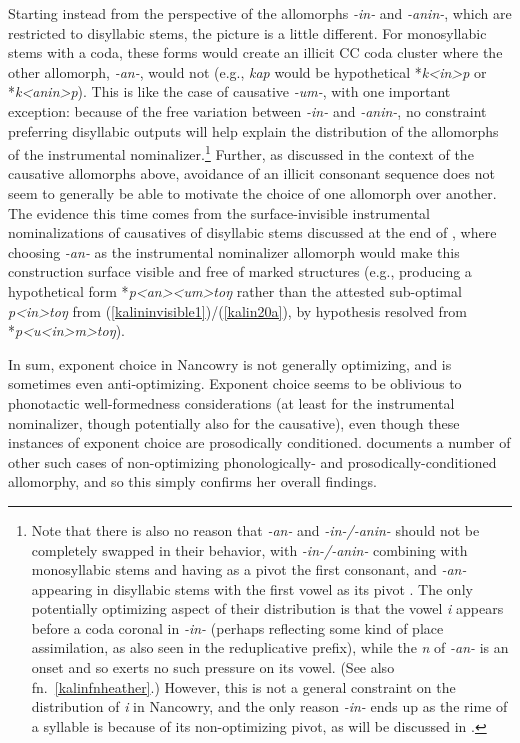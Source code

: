 \documentclass[output=paper]{langscibook}
\begin{document}
Starting instead from the perspective of the allomorphs \textit{-in-} and \textit{-anin-}, which are restricted to disyllabic stems, the picture is a little different. For monosyllabic stems with a coda, these forms would create an illicit CC coda cluster where the other allomorph, \textit{-an-}, would not (e.g., \textit{kap} would be hypothetical *\textit{k<in>p} or *\textit{k<anin>p}). This is like the case of causative \textit{-um-}, with one important exception:  because of the free variation between \textit{-in-} and \textit{-anin-}, no constraint preferring disyllabic outputs will help explain the distribution of the allomorphs of the instrumental nominalizer.\footnote{Note that there is also no reason that \textit{-an-} and \textit{-in-/-anin-} should not be completely swapped in their behavior, with \textit{-in-/-anin-} combining with monosyllabic stems and having as a pivot the first consonant, and \textit{-an-} appearing in disyllabic stems with the first vowel as its pivot \citep[167--168]{Paster06}. The only potentially optimizing aspect of their distribution is that the vowel \textit{i} appears before a coda coronal in \textit{-in-} (perhaps reflecting some kind of place assimilation, as also seen in the reduplicative prefix), while the \textit{n} of \textit{-an-} is an onset and so exerts no such pressure on its vowel. (See also fn.\ \ref{kalinfnheather}.) However, this is not a general constraint on the distribution of \textit{i} in Nancowry, and the only reason \textit{-in-} ends up as the rime of a syllable is because of its non-optimizing pivot, as will be discussed in .} Further, as discussed in the context of the causative allomorphs above, avoidance of an illicit consonant sequence does not seem to generally be able to motivate the choice of one allomorph over another. The evidence this time comes from the surface-invisible instrumental nominalizations of causatives of disyllabic stems discussed at the end of , where choosing \textit{-an-} as the instrumental nominalizer allomorph would make this construction surface visible and free of marked structures (e.g., producing a hypothetical form *\textit{p<an><um>toŋ} rather than the attested sub-optimal \textit{p<in>toŋ} from (\ref{kalininvisible1})/(\ref{kalin20a}), by hypothesis resolved from *\textit{p<u<in>m>toŋ}). 

In sum, exponent choice in Nancowry is not generally optimizing, and is sometimes even anti-optimizing. Exponent choice seems to be oblivious to phonotactic well-formedness considerations (at least for the instrumental nominalizer, though potentially also for the causative), even though these instances of exponent choice are prosodically conditioned. \citet{Paster05,Paster06} documents a number of other such cases of non-optimizing phonologically- and prosodically-conditioned allomorphy, and so this simply confirms her overall findings.
\end{document}
